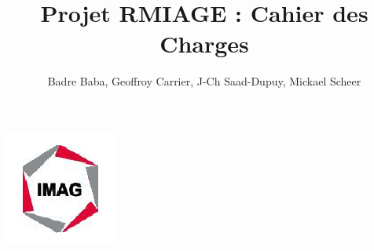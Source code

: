 \documentclass[10pt,a4paper]{article}
\title{Projet RMIAGE : Cahier des Charges}
\author{
	Badre Baba, Geoffroy Carrier, J-Ch Saad-Dupuy, Mickael Scheer
}
\begin{document}
\maketitle
\includegraphics{imag_logo.png}



\end{document}
